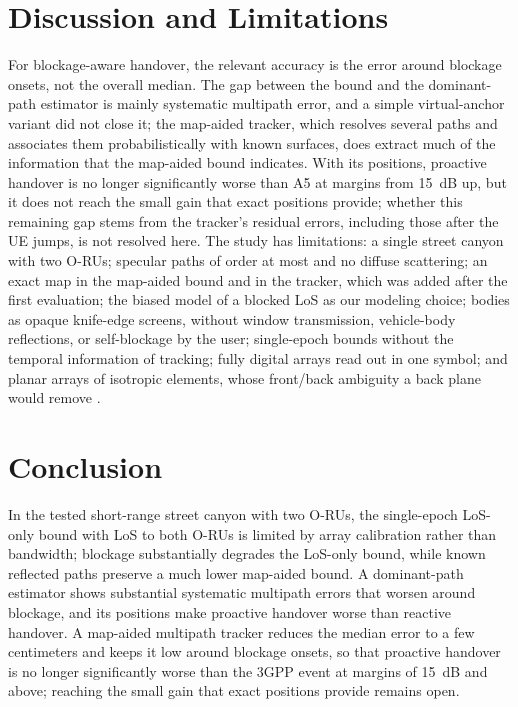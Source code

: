 \documentclass[conference]{IEEEtran}
\begin{document}
\section{Discussion and Limitations}
For blockage-aware handover, the relevant accuracy is the error around
blockage onsets, not the overall median. The gap between the bound and
the dominant-path estimator is mainly systematic multipath error, and a
simple virtual-anchor variant did not close it; the map-aided tracker,
which resolves several paths and associates them probabilistically with
known surfaces, does extract much of the information that the map-aided
bound indicates. With its positions, proactive handover is no longer
significantly worse than A5 at margins from \SI{15}{dB} up, but it does not reach the small gain that exact positions
provide; whether this remaining gap stems from the tracker's residual
errors, including those after the UE jumps, is not resolved here. The study has
limitations: a single street canyon with two O-RUs; specular paths of order at most \pMaxDepth{} and no diffuse scattering; an exact map in the map-aided bound and in the tracker, which was added after the first evaluation; the biased model of a blocked LoS as our
modeling choice; bodies as opaque knife-edge screens, without window
transmission, vehicle-body reflections, or self-blockage by the user; single-epoch bounds without the temporal information
of tracking; fully digital arrays read out in one symbol; and planar
arrays of isotropic elements, whose front/back
ambiguity a back plane would remove
\cite{dong2026deployable}.

\section{Conclusion}
In the tested short-range street canyon with two O-RUs, the single-epoch
LoS-only bound with LoS to both O-RUs is limited by array calibration
rather than bandwidth; blockage substantially degrades
the LoS-only bound, while known reflected paths preserve a much lower
map-aided bound. A dominant-path estimator shows substantial systematic
multipath errors that worsen around blockage, and its positions make
proactive handover worse than reactive handover. A map-aided multipath
tracker reduces the median error to a few centimeters and keeps it low
around blockage onsets, so that proactive handover is no longer
significantly worse than the 3GPP event at margins of \SI{15}{dB} and
above; reaching the small gain that exact positions
provide remains open.
\end{document}
